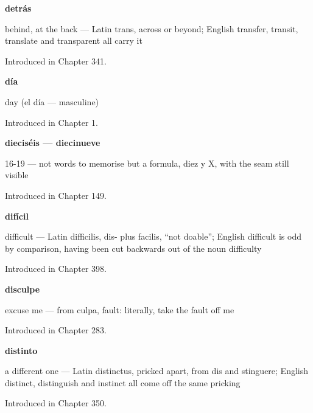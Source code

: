 \noindent\begin{minipage}[t]{\linewidth}
\raggedright
\textbf{detrás}\par
\small behind, at the back — Latin trans, across or beyond; English transfer, transit, translate and transparent all carry it\par
\footnotesize Introduced in Chapter 341.
\end{minipage}\par\medskip

\noindent\begin{minipage}[t]{\linewidth}
\raggedright
\textbf{día}\par
\small day (el día — masculine)\par
\footnotesize Introduced in Chapter 1.
\end{minipage}\par\medskip

\noindent\begin{minipage}[t]{\linewidth}
\raggedright
\textbf{dieciséis — diecinueve}\par
\small 16-19 — not words to memorise but a formula, diez y X, with the seam still visible\par
\footnotesize Introduced in Chapter 149.
\end{minipage}\par\medskip

\noindent\begin{minipage}[t]{\linewidth}
\raggedright
\textbf{difícil}\par
\small difficult — Latin difficilis, dis- plus facilis, \textquotedblleft{}not doable\textquotedblright{}; English difficult is odd by comparison, having been cut backwards out of the noun difficulty\par
\footnotesize Introduced in Chapter 398.
\end{minipage}\par\medskip

\noindent\begin{minipage}[t]{\linewidth}
\raggedright
\textbf{disculpe}\par
\small excuse me — from culpa, fault: literally, take the fault off me\par
\footnotesize Introduced in Chapter 283.
\end{minipage}\par\medskip

\noindent\begin{minipage}[t]{\linewidth}
\raggedright
\textbf{distinto}\par
\small a different one — Latin distinctus, pricked apart, from dis and stinguere; English distinct, distinguish and instinct all come off the same pricking\par
\footnotesize Introduced in Chapter 350.
\end{minipage}\par\medskip

